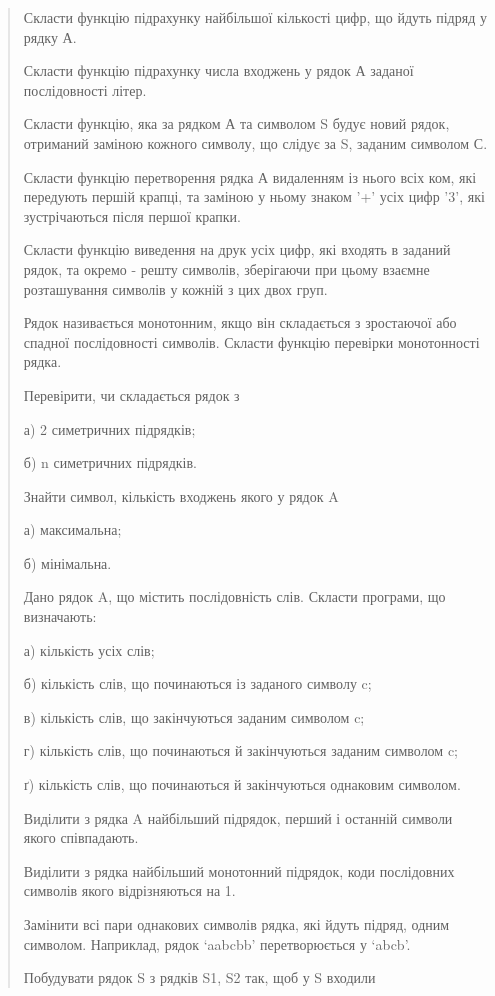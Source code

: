 \documentclass[]{article}
\begin{document}
\begin{quote}
Скласти функцію підрахунку найбільшої кількості цифр, що йдуть підряд у
рядку А.

Скласти функцію підрахунку числа входжень у рядок А заданої
послідовності літер.

Скласти функцію, яка за рядком А та символом S будує новий рядок,
отриманий заміною кожного символу, що слідує за S, заданим символом С.

Скласти функцію перетворення рядка А видаленням із нього всіх ком, які
передують першій крапці, та заміною у ньому знаком '+' усіх цифр '3',
які зустрічаються після першої крапки.

Скласти функцію виведення на друк усіх цифр, які входять в заданий
рядок, та окремо - решту символів, зберігаючи при цьому взаємне
розташування символів у кожній з цих двох груп.

Рядок називається монотонним, якщо він складається з зростаючої або
спадної послідовності символів. Скласти функцію перевірки монотонності
рядка.

Перевірити, чи складається рядок з

а) 2 симетричних підрядків;

б) n симетричних підрядків.

Знайти символ, кількість входжень якого у рядок A

а) максимальна;

б) мінімальна.

Дано рядок A, що містить послідовність слів. Скласти програми, що
визначають:

а) кількість усіх слів;

б) кількість слів, що починаються із заданого символу c;

в) кількість слів, що закінчуються заданим символом c;

г) кількість слів, що починаються й закінчуються заданим символом c;

ґ) кількість слів, що починаються й закінчуються однаковим символом.

Виділити з рядка A найбільший підрядок, перший і останній символи якого
співпадають.

Виділити з рядка найбільший монотонний підрядок, коди послідовних
символів якого відрізняються на 1.

Замінити всі пари однакових символів рядка, які йдуть підряд, одним
символом. Наприклад, рядок `aabcbb' перетворюється у `abcb'.

Побудувати рядок S з рядків S1, S2 так, щоб у S входили


\end{quote}
\end{document}
